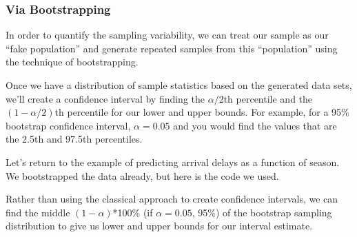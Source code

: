 \documentclass[
]{book}
\newenvironment{Shaded}{\begin{snugshade}}{\end{snugshade}}
\newcommand{\CommentTok}[1]{\textcolor[rgb]{0.56,0.35,0.01}{\textit{#1}}}
\newcommand{\DataTypeTok}[1]{\textcolor[rgb]{0.13,0.29,0.53}{#1}}
\newcommand{\DecValTok}[1]{\textcolor[rgb]{0.00,0.00,0.81}{#1}}
\newcommand{\FloatTok}[1]{\textcolor[rgb]{0.00,0.00,0.81}{#1}}
\newcommand{\KeywordTok}[1]{\textcolor[rgb]{0.13,0.29,0.53}{\textbf{#1}}}
\newcommand{\NormalTok}[1]{#1}
\newcommand{\OperatorTok}[1]{\textcolor[rgb]{0.81,0.36,0.00}{\textbf{#1}}}
\newcommand{\OtherTok}[1]{\textcolor[rgb]{0.56,0.35,0.01}{#1}}
\newcommand{\StringTok}[1]{\textcolor[rgb]{0.31,0.60,0.02}{#1}}
\begin{document}
\hypertarget{via-bootstrapping}{%
\subsubsection{Via Bootstrapping}\label{via-bootstrapping}}

In order to quantify the sampling variability, we can treat our sample as our ``fake population'' and generate repeated samples from this ``population'' using the technique of bootstrapping.

Once we have a distribution of sample statistics based on the generated data sets, we'll create a confidence interval by finding the \(\alpha/2\)th percentile and the \((1-\alpha/2)\)th percentile for our lower and upper bounds. For example, for a 95\% bootstrap confidence interval, \(\alpha = 0.05\) and you would find the values that are the 2.5th and 97.5th percentiles.

Let's return to the example of predicting arrival delays as a function of season. We bootstrapped the data already, but here is the code we used.

\begin{Shaded}
\end{Shaded}

Rather than using the classical approach to create confidence intervals, we can find the middle \((1-\alpha)\)*100\% (if \(\alpha = 0.05\), 95\%) of the bootstrap sampling distribution to give us lower and upper bounds for our interval estimate.

\begin{Shaded}
\end{Shaded}
\end{document}
